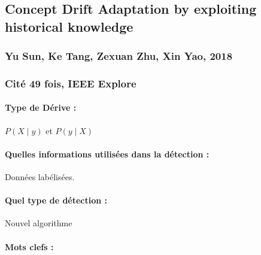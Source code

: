 \documentclass[11pt,a4paper]{report}
\begin{document}
\subsection{Concept Drift Adaptation by exploiting historical knowledge}
\subsubsection{Yu Sun, Ke Tang, Zexuan Zhu, Xin Yao, 2018}

\subsubsection{Cité 49 fois, IEEE Explore}

\paragraph{Type de Dérive :} $P(X\mid y)$ et $P(y \mid X)$
\paragraph{Quelles informations utilisées dans la détection :} Données labélisées.
\paragraph{Quel type de détection :} Nouvel algorithme

\paragraph{Mots clefs :} 
\end{document}
